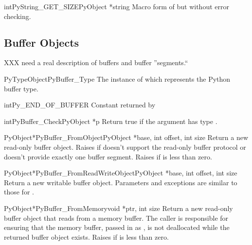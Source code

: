 \documentclass{manual}
\begin{document}
\begin{cfuncdesc}{int}{PyString_GET_SIZE}{PyObject *string}
Macro form of  but without error checking.
\end{cfuncdesc}


\subsection{Buffer Objects \label{bufferObjects}}

XXX need a real description of buffers and buffer ''segments.``

\begin{cvardesc}{PyTypeObject}{PyBuffer_Type}
The instance of  which represents the Python
buffer type.
\end{cvardesc}

\begin{cvardesc}{int}{Py_END_OF_BUFFER}
Constant returned by 
\end{cvardesc}

\begin{cfuncdesc}{int}{PyBuffer_Check}{PyObject *p}
Return true if the argument has type .
\end{cfuncdesc}

\begin{cfuncdesc}{PyObject*}{PyBuffer_FromObject}{PyObject *base,
                                                  int offset, int size}
Return a new read-only buffer object.
Raises  if  doesn't support the
read-only buffer protocol or doesn't provide exactly one buffer
segment.  Raises  if  is less than
zero.
\end{cfuncdesc}

\begin{cfuncdesc}{PyObject*}{PyBuffer_FromReadWriteObject}{PyObject *base,
                                                           int offset,
                                                           int size}
Return a new writable buffer object.  Parameters and exceptions are
similar to those for .
\end{cfuncdesc}

\begin{cfuncdesc}{PyObject*}{PyBuffer_FromMemory}{void *ptr, int size}
Return a new read-only buffer object that reads from a memory buffer.
The caller is responsible for ensuring that the memory buffer, passed
in as , is not deallocated while the returned buffer object
exists.  Raises  if  is less than
zero.
\end{cfuncdesc}
\end{document}

